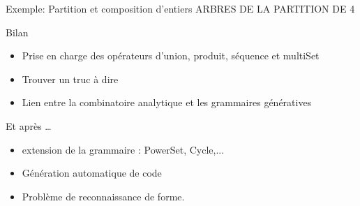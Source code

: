 \documentclass{beamer}
\begin{document}
\begin{frame}{Exemple: Partition et composition d'entiers}
ARBRES DE LA PARTITION DE 4
\end{frame}

\begin{frame}{Bilan}
\begin{itemize}
\item Prise en charge des opérateurs d'union, produit, séquence et multiSet
\item Trouver un truc à dire
\item Lien entre la combinatoire analytique et les grammaires génératives
\end{itemize}
\end{frame}



\begin{frame}{Et après \ldots}
\begin{itemize}
\item extension de la grammaire : PowerSet, Cycle,...
\item Génération automatique de code
\item Problème de reconnaissance de forme.
\end{itemize}
\end{frame}
  


\end{document}
